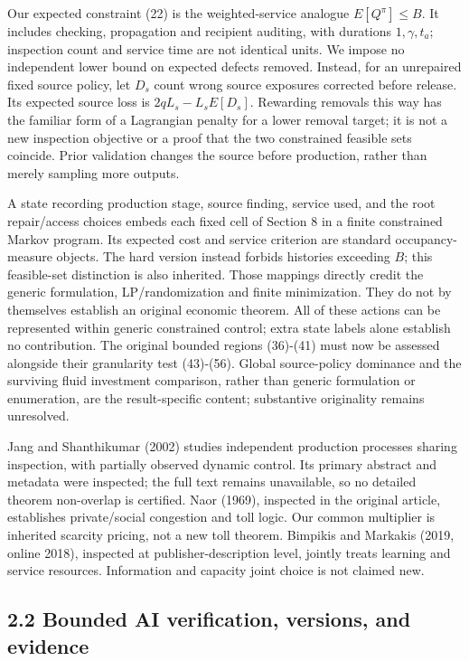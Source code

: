 \documentclass[
  11pt,
  a4paper,
]{article}
\begin{document}
Our expected constraint (22) is the weighted-service analogue
\(E[Q^\pi]\leq B\). It includes checking, propagation and recipient
auditing, with durations \(1,\gamma,t_a\); inspection count and service
time are not identical units. We impose no independent lower bound on
expected defects removed. Instead, for an unrepaired fixed source
policy, let \(D_s\) count wrong source exposures corrected before
release. Its expected source loss is \(2qL_s-L_s E[D_s]\). Rewarding
removals this way has the familiar form of a Lagrangian penalty for a
lower removal target; it is not a new inspection objective or a proof
that the two constrained feasible sets coincide. Prior validation
changes the source before production, rather than merely sampling more
outputs.

A state recording production stage, source finding, service used, and
the root repair/access choices embeds each fixed cell of Section 8 in a
finite constrained Markov program. Its expected cost and service
criterion are standard occupancy-measure objects. The hard version
instead forbids histories exceeding \(B\); this feasible-set distinction
is also inherited. Those mappings directly credit the generic
formulation, LP/randomization and finite minimization. They do not by
themselves establish an original economic theorem. All of these actions
can be represented within generic constrained control; extra state
labels alone establish no contribution. The original bounded regions
(36)-(41) must now be assessed alongside their granularity test
(43)-(56). Global source-policy dominance and the surviving fluid
investment comparison, rather than generic formulation or enumeration,
are the result-specific content; substantive originality remains
unresolved.

Jang and Shanthikumar (2002) studies independent production processes
sharing inspection, with partially observed dynamic control. Its primary
abstract and metadata were inspected; the full text remains unavailable,
so no detailed theorem non-overlap is certified. Naor (1969), inspected
in the original article, establishes private/social congestion and toll
logic. Our common multiplier is inherited scarcity pricing, not a new
toll theorem. Bimpikis and Markakis (2019, online 2018), inspected at
publisher-description level, jointly treats learning and service
resources. Information and capacity joint choice is not claimed new.

\hypertarget{bounded-ai-verification-versions-and-evidence}{%
\subsection{2.2 Bounded AI verification, versions, and
evidence}\label{bounded-ai-verification-versions-and-evidence}}
\end{document}

